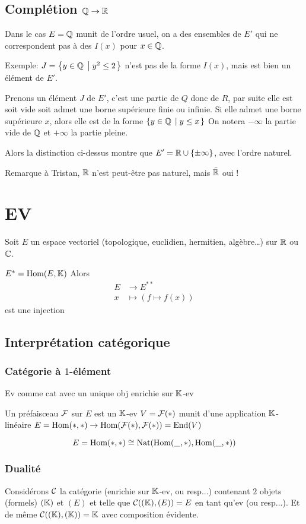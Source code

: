 \documentclass[12pt,makeidx, draft]{amsart}
\DeclareMathOperator\Nat{\text{Nat}}
\begin{document}
\subsection{Complétion $\mathbb{Q} \to \mathbb{R}$}
Dans le cas $E = \mathbb{Q}$ munit de l'ordre usuel,
on a des ensembles de $E'$ qui ne correspondent pas à des $I(x)$ pour $x \in \mathbb{Q}$.

Exemple: $J = \left\lbrace {y \in \mathbb{Q}} \; \left| \; {y^2 \leq 2} \right. \right\rbrace$ n'est pas de la forme $I(x)$, mais est bien un élément de $E'$.

Prenons un élément $J$ de $E'$, c'est une partie de $Q$ donc de $R$, par suite elle est soit vide soit admet une borne supérieure finie ou infinie. Si elle admet une borne supérieure $x$, alors elle est de la forme $\left\lbrace {y\in \mathbb{Q}} \; \left| \; {y \leq x} \right. \right\rbrace$
On notera $-\infty$ la partie vide de $\mathbb{Q}$ et $+\infty$ la partie pleine.

Alors la distinction ci-dessus montre que $E' = \mathbb{R} \cup \{\pm \infty\}$, avec l'ordre naturel.

Remarque à Tristan, $\mathbb{R}$ n'est peut-être pas naturel, mais $\bar{\mathbb{R}}$ oui !

\section{EV}
Soit $E$ un espace vectoriel (topologique, euclidien, hermitien, algèbre…) sur $\mathbb{R}$ ou $\mathbb{C}$.

$E^* = \text{Hom}(E,\mathbb{K})$
Alors
\begin{align*}
E &\longrightarrow E^{**}\\
x &\mapsto (f \mapsto f(x)) 
\end{align*}
est une injection

\subsection{Interprétation catégorique}
\subsubsection{Catégorie à $1$-élément}
Ev comme cat avec un unique obj enrichie sur $\mathbb{K}$-ev

Un préfaisceau $\mathcal{F}$ sur $E$ est un $\mathbb{K}$-ev $V = \mathcal{F}(*)$ munit d'une application $\mathbb{K}$-linéaire $E = \text{Hom}(*,*) \to \text{Hom}(\mathcal{F}(*),\mathcal{F}(*)) = \text{End}(V)$

\begin{equation}
E = \Hom(*,*) \cong \Nat(\Hom(\_,*),\Hom(\_,*))
\end{equation}
\subsubsection{Dualité}
Considérons $\mathcal{C}$ la catégorie (enrichie sur $\mathbb{K}$-ev, ou resp...) contenant $2$ objets (formels) $(\mathbb{K})$ et $(E)$ et telle que $\mathcal{C}((\mathbb{K}),(E)) = E$ en tant qu'ev (ou resp...). Et de même $\mathcal{C}((\mathbb{K}),(\mathbb{K})) = \mathbb{K}$ avec composition évidente.
\end{document}
